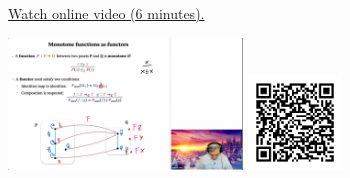 
\begin{minipage}{10cm}
    \href{https://act4e-spring21.netlify.app/spring2021-functors:semi-and-fun:mon-functions:mon-fun-as-func.html}{Watch online video (6 minutes).}
        
    \href{https://act4e-spring21.netlify.app/spring2021-functors:semi-and-fun:mon-functions:mon-fun-as-func.html}{\includegraphics[height=3.5cm]{spring2021-functors:semi-and-fun:mon-functions:mon-fun-as-func/thumbnails.jpg}}
    \href{https://act4e-spring21.netlify.app/spring2021-functors:semi-and-fun:mon-functions:mon-fun-as-func.html}{\includegraphics[height=2.5cm]{spring2021-functors:semi-and-fun:mon-functions:mon-fun-as-func/qrcode.png}}
\end{minipage}

